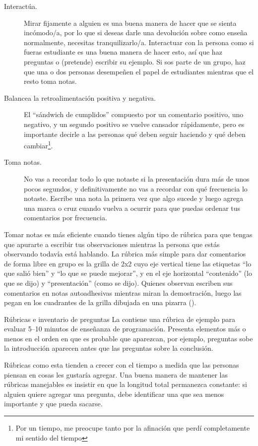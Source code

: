 \begin{description}

\item[Interactúa.]
  Mirar fijamente a alguien es una buena manera de hacer que se sienta incómodo/a,
  por lo que si deseas darle una devolución sobre como enseña normalmente,
  necesitas tranquilizarlo/a.
  Interactuar con la persona como si fueras estudiante es una buena manera de hacer esto,
  así que haz preguntas o (pretende) escribir su ejemplo.
  Si sos parte de un grupo,
  haz que una o dos personas desempeñen el papel de estudiantes
  mientras que el resto toma notas.

\item[Balancea la retroalimentación positiva y negativa.]
  El ``sándwich de cumplidos'' compuesto por un comentario positivo,
  uno negativo,
  y un segundo positivo
  se vuelve cansador rápidamente,
  pero es importante decirle a las personas qué deben seguir haciendo
  y qué deben cambiar\footnote{
    Por un tiempo,
    me preocupe tanto por la afinación que perdí completamente mi sentido del tiempo
  }.

\item[Toma notas.]
  No vas a recordar todo lo que notaste
  si la presentación dura más de unos pocos segundos,
  y definitivamente no vas a recordar con qué frecuencia lo notaste.
  Escribe una nota la primera vez que algo sucede
  y luego agrega una marca o cruz cuando vuelva a ocurrir 
  para que puedas ordenar tus comentarios por frecuencia.

\end{description}

Tomar notas es más eficiente cuando tienes algún tipo de rúbrica
para que tengas que apurarte a escribir tus observaciones 
mientras la persona que estás observando todavía está hablando.
La rúbrica más simple para dar comentarios de forma libre en grupo
es la grilla de 2x2 cuyo eje vertical tiene las etiquetas ``lo que salió bien'' y ``lo que se puede mejorar'',
y en el eje horizontal ``contenido'' (lo que se dijo)
y ``presentación'' (como se dijo).
Quienes observan escriben sus comentarios en notas autoadhesivas mientras miran la demostración,
luego las pegan en los cuadrantes de la grilla dibujada en una pizarra
().


\begin{aside}{Rúbricas e inventario de preguntas}
  La  contiene una rúbrica de ejemplo
  para evaluar 5--10 minutos de enseñanza de programación.
  Presenta elementos más o menos en el orden en que es probable que aparezcan,
  por ejemplo, preguntas sobe la introducción aparecen antes que las preguntas sobre la conclusión.

  Rúbricas como esta 
  tienden a crecer con el tiempo a medida que las personas piensan en cosas les gustaría agregar.
  Una buena manera de mantener las rúbricas manejables es insistir en que
  la longitud total permanezca constante:
  si alguien quiere agregar una pregunta,
  debe identificar una que sea menos importante y que pueda sacarse.
\end{aside}

